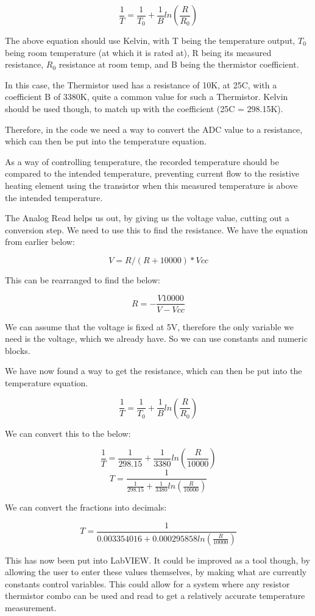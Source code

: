 \documentclass[a4paper,11pt]{report}
\begin{document}
\[\frac{1}{T} = \frac{1}{T_0} + \frac{1}{B}ln(\frac{R}{R_0})\]

The above equation should use Kelvin, with T being the temperature output, $T_0$ being room temperature (at which it is rated at), R being its measured resistance, $R_0$ resistance at room temp, and B being the thermistor coefficient.

In this case, the Thermistor used has a resistance of 10K, at 25\degree C, with a coefficient B of 3380K, quite a common value for such a Thermistor. Kelvin should be used though, to match up with the coefficient (25\degree C = 298.15\degree K).

Therefore, in the code we need a way to convert the ADC value to a resistance, which can then be put into the temperature equation.

As a way of controlling temperature, the recorded temperature should be compared to the intended temperature, preventing current flow to the resistive heating element using the transistor when this measured temperature is above the intended temperature.

The Analog Read helps us out, by giving us the voltage value, cutting out a conversion step. We need to use this to find the resistance. We have the equation from earlier below:

\[V = R / (R + 10000) * Vcc\]

This can be rearranged to find the below:

\[R=-\frac{V10000}{V-Vcc}\]

We can assume that the voltage is fixed at 5V, therefore the only variable we need is the voltage, which we already have. So we can use constants and numeric blocks.

We have now found a way to get the resistance, which can then be put into the temperature equation.

\[\frac{1}{T} = \frac{1}{T_0} + \frac{1}{B}ln(\frac{R}{R_0})\]

We can convert this to the below:

\[\frac{1}{T} = \frac{1}{298.15} + \frac{1}{3380}ln(\frac{R}{10000})\]
\[T = \frac{1}{\frac{1}{298.15} + \frac{1}{3380}ln(\frac{R}{10000})}\]

We can convert the fractions into decimals:

\[T = \frac{1}{0.003354016 + 0.000295858ln(\frac{R}{10000})}\]

This has now been put into LabVIEW. It could be improved as a tool though, by allowing the user to enter these values themselves, by making what are currently constants control variables. This could allow for a system where any resistor thermistor combo can be used and read to get a relatively accurate temperature measurement.
\end{document}
